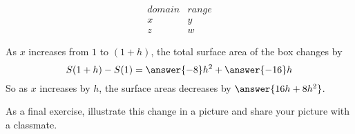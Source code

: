 \documentclass{ximera}
\begin{document}
\begin{exercise}
\[
\begin{array}{|c|c|}
domain & range \\
\hline
x & y \\
\hline
z & w 
\end{array}
\]
\end{exercise}







\begin{exercise}
  As $x$ increases from $1$ to $(1+h)$, the total surface area of the
  box changes by
  \[
  S(1+h) - S(1) = \answer{-8}h^2 + \answer{-16}h
  \]
  So as $x$ increases by $h$, the surface areas decreases by
  $\answer{16h+8h^2}$.

  As a final exercise, illustrate this change in a picture and share your picture with a classmate.
  \begin{multipleChoice}
  \end{multipleChoice}
\end{exercise}
\end{document}

